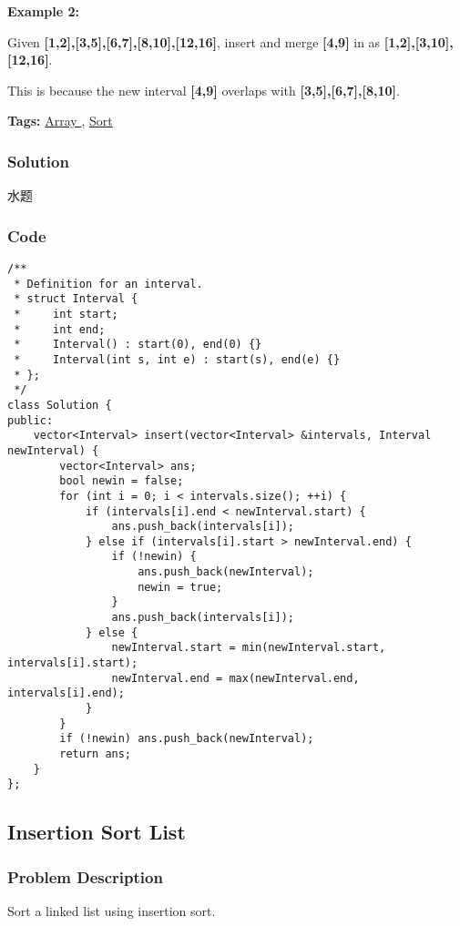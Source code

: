 \documentclass{article}
\begin{document}
\begin{CJK*}{UTF8}{gkai}
\textbf{Example 2:}


Given \textbf{[1,2],[3,5],[6,7],[8,10],[12,16]}, insert and merge \textbf{[4,9]} in as \textbf{[1,2],[3,10],[12,16]}.

This is because the new interval \textbf{[4,9]} overlaps with \textbf{[3,5],[6,7],[8,10]}.


\textbf{Tags: }
\hyperref[ Array ]{ Array },  \hyperref[ Sort ]{ Sort }



\subsubsection*{Solution}
水题

\subsubsection*{Code}
\begin{lstlisting}
/**
 * Definition for an interval.
 * struct Interval {
 *     int start;
 *     int end;
 *     Interval() : start(0), end(0) {}
 *     Interval(int s, int e) : start(s), end(e) {}
 * };
 */
class Solution {
public:
    vector<Interval> insert(vector<Interval> &intervals, Interval newInterval) {
        vector<Interval> ans;
        bool newin = false;
        for (int i = 0; i < intervals.size(); ++i) {
            if (intervals[i].end < newInterval.start) {
                ans.push_back(intervals[i]);
            } else if (intervals[i].start > newInterval.end) {
                if (!newin) {
                    ans.push_back(newInterval);
                    newin = true;
                }
                ans.push_back(intervals[i]);
            } else {
                newInterval.start = min(newInterval.start, intervals[i].start);
                newInterval.end = max(newInterval.end, intervals[i].end);
            }
        }
        if (!newin) ans.push_back(newInterval);
        return ans;
    }
}; 
\end{lstlisting}


\subsection{ Insertion Sort List }
\label{ Insertion Sort List }

\subsubsection*{Problem Description}
Sort a linked list using insertion sort.



\end{CJK*}
\end{document}

